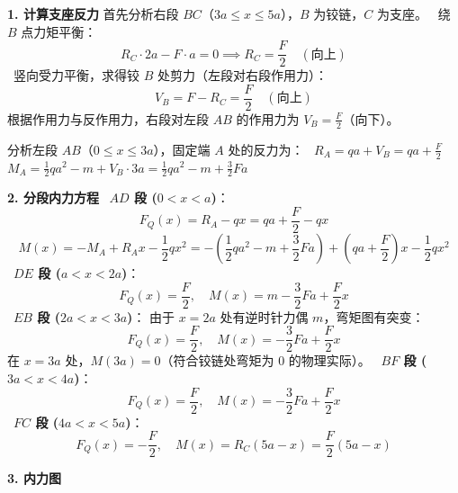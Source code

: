 \documentclass[11pt,a4paper]{ctexrep}
\begin{document}
{\textbf{1. 计算支座反力}
首先分析右段 $BC$（$3a \le x \le 5a$），$B$ 为铰链，$C$ 为支座。
\noindent\textbullet\ 绕 $B$ 点力矩平衡：
  \[
  R_C \cdot 2a - F \cdot a = 0 \implies R_C = \frac{F}{2} \quad (\text{向上})
  \]
\noindent\textbullet\ 竖向受力平衡，求得铰 $B$ 处剪力（左段对右段作用力）：
  \[
  V_B = F - R_C = \frac{F}{2} \quad (\text{向上})
  \]
  根据作用力与反作用力，右段对左段 $AB$ 的作用力为 $V_B = \frac{F}{2}$（向下）。

分析左段 $AB$（$0 \le x \le 3a$），固定端 $A$ 处的反力为：
\noindent\textbullet\ $R_A = qa + V_B = qa + \frac{F}{2}$
\noindent\textbullet\ $M_A = \frac{1}{2}qa^2 - m + V_B \cdot 3a = \frac{1}{2}qa^2 - m + \frac{3}{2}Fa$

\textbf{2. 分段内力方程}
\noindent\textbullet\ \textbf{$AD$ 段 ($0 < x < a$)}：
  \[
  F_Q(x) = R_A - qx = qa + \frac{F}{2} - qx
  \]
  \[
  M(x) = -M_A + R_A x - \frac{1}{2}qx^2 = -\left(\frac{1}{2}qa^2 - m + \frac{3}{2}Fa\right) + \left(qa + \frac{F}{2}\right)x - \frac{1}{2}qx^2
  \]
\noindent\textbullet\ \textbf{$DE$ 段 ($a < x < 2a$)}：
  \[
  F_Q(x) = \frac{F}{2}, \quad M(x) = m - \frac{3}{2}Fa + \frac{F}{2}x
  \]
\noindent\textbullet\ \textbf{$EB$ 段 ($2a < x < 3a$)}：
  由于 $x=2a$ 处有逆时针力偶 $m$，弯矩图有突变：
  \[
  F_Q(x) = \frac{F}{2}, \quad M(x) = -\frac{3}{2}Fa + \frac{F}{2}x
  \]
  在 $x=3a$ 处，$M(3a) = 0$（符合铰链处弯矩为 0 的物理实际）。
\noindent\textbullet\ \textbf{$BF$ 段 ($3a < x < 4a$)}：
  \[
  F_Q(x) = \frac{F}{2}, \quad M(x) = -\frac{3}{2}Fa + \frac{F}{2}x
  \]
\noindent\textbullet\ \textbf{$FC$ 段 ($4a < x < 5a$)}：
  \[
  F_Q(x) = -\frac{F}{2}, \quad M(x) = R_C(5a-x) = \frac{F}{2}(5a-x)
  \]

\textbf{3. 内力图}

\begin{figure}[H]
\centering
{}
\end{figure}}
\end{document}
